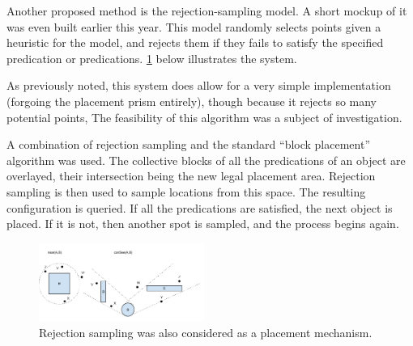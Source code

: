 Another proposed method is the rejection-sampling model. 
A short mockup of it was even built earlier this year. 
This model randomly selects points given a heuristic for the model, and rejects them if they fails to satisfy the specified predication or predications. 
\ref{fig:rejection_sampling_placement} below illustrates the system.

As previously noted, this system does allow for a very simple implementation (forgoing the placement prism entirely), though because it rejects so many potential points, The feasibility of this algorithm was a subject of investigation. 

A combination of rejection sampling and the standard ``block placement'' algorithm was used. The collective blocks of all the predications of an object are overlayed, their intersection being the new legal placement area. Rejection sampling is then used to sample locations from this space. The resulting configuration is queried. If all the predications are satisfied, the next object is placed. If it is not, then another spot is sampled, and the process begins again.

\begin{figure}[h]
	\begin{center}
		\includegraphics[width=0.48\textwidth]{figures/rejection_sampling_placement.png}
	\caption{Rejection sampling was also considered as a placement mechanism.}
	\label{fig:rejection_sampling_placement}
	\end{center}
\end{figure}